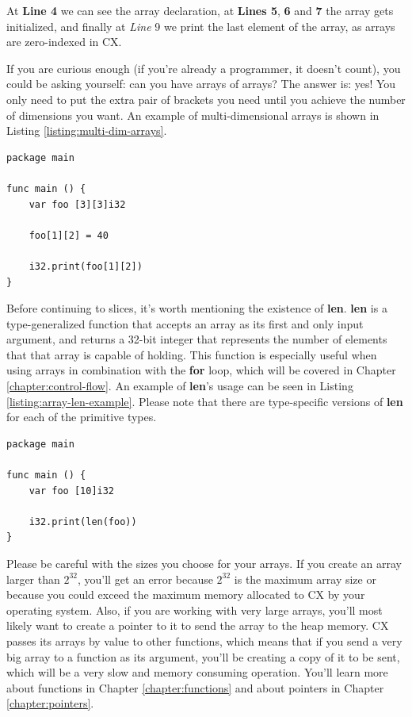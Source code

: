 \documentclass[11pt,fleqn,openany]{book} %
\begin{document}
At \textbf{Line 4} we can see the array declaration, at \textbf{Lines 5}, \textbf{6} and \textbf{7} the array gets initialized, and finally at \textit{Line} 9 we print the last element of the array, as arrays are zero-indexed in CX.

If you are curious enough (if you're already a programmer, it doesn't count), you could be asking yourself: can you have arrays of arrays? The answer is: yes! You only need to put the extra pair of brackets you need until you achieve the number of dimensions you want. An example of multi-dimensional arrays is shown in Listing \ref{listing:multi-dim-arrays}.

\begin{lstlisting}[caption={Multi-dimensional Arrays},captionpos=b,label={listing:multi-dim-arrays}]
package main

func main () {
	var foo [3][3]i32
    
    foo[1][2] = 40
    
    i32.print(foo[1][2])
}
\end{lstlisting}

Before continuing to slices, it's worth mentioning the existence of \textbf{len}. \textbf{len} is a type-generalized function that accepts an array as its first and only input argument, and returns a 32-bit integer that represents the number of elements that that array is capable of holding. This function is especially useful when using arrays in combination with the \textbf{for} loop, which will be covered in Chapter \ref{chapter:control-flow}. An example of \textbf{len}'s usage can be seen in Listing \ref{listing:array-len-example}. Please note that there are type-specific versions of \textbf{len} for each of the primitive types.

\begin{lstlisting}[caption={Printing Array Length},captionpos=b,label={listing:array-len-example}]
package main

func main () {
	var foo [10]i32
    
    i32.print(len(foo))
}
\end{lstlisting}

Please be careful with the sizes you choose for your arrays. If you create an array larger than $2^{32}$, you'll get an error because $2^{32}$ is the maximum array size or because you could exceed the maximum memory allocated to CX by your operating system. Also, if you are working with very large arrays, you'll most likely want to create a pointer to it to send the array to the heap memory. CX passes its arrays by value to other functions, which means that if you send a very big array to a function as its argument, you'll be creating a copy of it to be sent, which will be a very slow and memory consuming operation. You'll learn more about functions in Chapter \ref{chapter:functions} and about pointers in Chapter \ref{chapter:pointers}.
\end{document}
